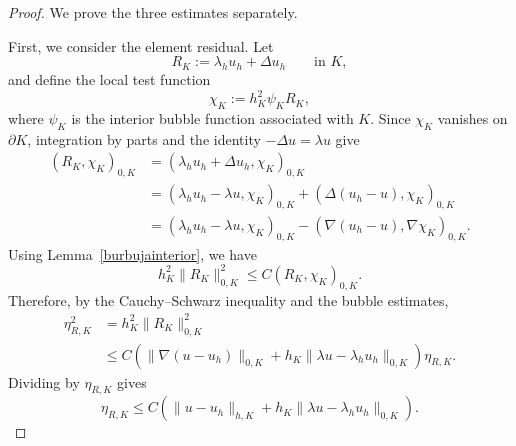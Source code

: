 \documentclass[onefignum,onetabnum,final]{siamart250211}
\numberwithin{equation}{section}
\newcommand\0{\boldsymbol{0}}
\begin{document}
\begin{proof}
We prove the three estimates separately.

First, we consider the element residual. Let
\[
   R_K:=\lambda_hu_h+\Delta u_h \qquad \text{in } K,
\]
and define the local test function
\[
   \chi_K:=h_K^2\psi_K R_K,
\]
where $\psi_K$ is the interior bubble function associated with $K$. Since $\chi_K$ vanishes on $\partial K$, integration by parts and the identity $-\Delta u=\lambda u$ give
\[
\begin{aligned}
(R_K,\chi_K)_{0,K} &=(\lambda_hu_h+\Delta u_h,\chi_K)_{0,K} \\
&=(\lambda_hu_h-\lambda u,\chi_K)_{0,K} + (\Delta(u_h-u),\chi_K)_{0,K} \\
&= (\lambda_hu_h-\lambda u,\chi_K)_{0,K} - (\nabla(u_h-u),\nabla\chi_K)_{0,K}.
\end{aligned}
\]
Using Lemma~\ref{burbujainterior}, we have
\[
   h_K^2\|R_K\|_{0,K}^2 \le C(R_K,\chi_K)_{0,K}.
\]
Therefore, by the Cauchy--Schwarz inequality and the bubble estimates,
\[
\begin{aligned}
\eta_{R,K}^2 &= h_K^2\|R_K\|_{0,K}^2 \\
&\le C\left( \|\nabla(u-u_h)\|_{0,K} + h_K\|\lambda u-\lambda_hu_h\|_{0,K}\right) \eta_{R,K}.
\end{aligned}
\]
Dividing by $\eta_{R,K}$ gives
\[
   \eta_{R,K} \le C\left(\|u-u_h\|_{h,K} + h_K\|\lambda u-\lambda_hu_h\|_{0,K}\right).
\]


\end{proof}
\end{document}
